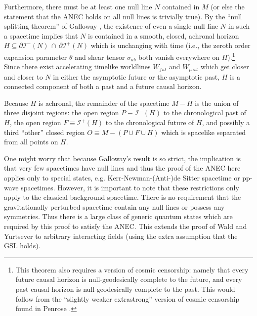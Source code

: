 \documentclass{article}
\begin{document}
Furthermore, there must be at least one null line $N$ contained in $M$ (or else the statement that the ANEC holds on all null lines is trivially true).  By the ``null splitting theorem'' of Galloway \cite{galloway00}, the existence of even a single null line $N$ in such a spacetime implies that $N$ is contained in a smooth, closed, achronal horizon $H \subseteq \partial \mathcal{I}^-(N)\,\cap\,\partial \mathcal{I}^+(N)$ which is unchanging with time (i.e., the zeroth order expansion parameter $\theta$ and shear tensor $\sigma_{ab}$ both vanish everywhere on $H$).\footnote{This theorem also requires a version of cosmic censorship: namely that every future causal horizon is null-geodesically complete to the future, and every past causal horizon is null-geodesically complete to the past.  This would follow from the ``slightly weaker extrastrong'' version of cosmic censorship found in Penrose \cite{penrose99}.}  Since there exist accelerating timelike worldlines $W_{fut}$ and $W_{past}$ which get closer and closer to $N$ in either the asymptotic future or the asymptotic past, $H$ is a connected component of both a past and a future causal horizon.

Because $H$ is achronal, the remainder of the spacetime $M - H$ is the union of three disjoint regions: the open region $P \equiv \mathcal{I}^-(H)$ to the chronological past of $H$, the open region $F \equiv \mathcal{I}^+(H)$ to the chronological future of $H$, and possibly a third ``other'' closed region $O \equiv M - (P \cup F \cup H)$ which is spacelike separated from all points on $H$.

One might worry that because Galloway's result is so strict, the implication is that very few spacetimes have null lines and thus the proof of the ANEC here applies only to special states, e.g. Kerr-Newman-(Anti-)de Sitter spacetime or pp-wave spacetimes.  However, it is important to note that these restrictions only apply to the classical background spacetime.  There is no requirement that the gravitationally perturbed spacetime contain any null lines or possess any symmetries.  Thus there is a large class of generic quantum states which are required by this proof to satisfy the ANEC.  This extends the proof of Wald and Yurtsever \cite{WY91} to arbitrary interacting fields (using the extra assumption that the GSL holds).
\end{document}
